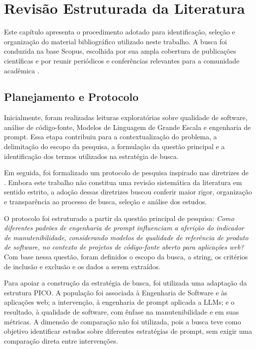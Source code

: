 \chapter[Revisão Estruturada da Literatura]{Revisão Estruturada da Literatura}
Este capítulo apresenta o procedimento adotado para identificação, seleção e organização do material bibliográfico utilizado neste trabalho. A busca foi conduzida na base Scopus, escolhida por sua ampla cobertura de publicações científicas e por reunir periódicos e conferências relevantes para a comunidade acadêmica \cite{elsevier2024}.

\section{Planejamento e Protocolo}
Inicialmente, foram realizadas leituras exploratórias sobre qualidade de software, análise de código-fonte, Modelos de Linguagem de Grande Escala e engenharia de prompt. Essa etapa contribuiu para a contextualização do problema, a delimitação do escopo da pesquisa, a formulação da questão principal e a identificação dos termos utilizados na estratégia de busca.

Em seguida, foi formalizado um protocolo de pesquisa inspirado nas diretrizes de . Embora este trabalho não constitua uma revisão sistemática da literatura em sentido estrito, a adoção dessas diretrizes buscou conferir maior rigor, organização e transparência ao processo de busca, seleção e análise dos estudos.

O protocolo foi estruturado a partir da questão principal de pesquisa: \textit{Como diferentes padrões de engenharia de prompt influenciam a aferição do indicador de manutenibilidade, considerando modelos de qualidade de referência de produto de software, no contexto de projetos de código-fonte aberto para aplicações web?} Com base nessa questão, foram definidos o escopo da busca, a string, os critérios de inclusão e exclusão e os dados a serem extraídos.

Para apoiar a construção da estratégia de busca, foi utilizada uma adaptação da estrutura PICO. A população foi associada à Engenharia de Software e às aplicações web; a intervenção, à engenharia de prompt aplicada a LLMs; e o resultado, à qualidade de software, com ênfase na manutenibilidade e em suas métricas. A dimensão de comparação não foi utilizada, pois a busca teve como objetivo identificar estudos sobre diferentes estratégias de prompt, sem exigir uma comparação direta entre intervenções.

